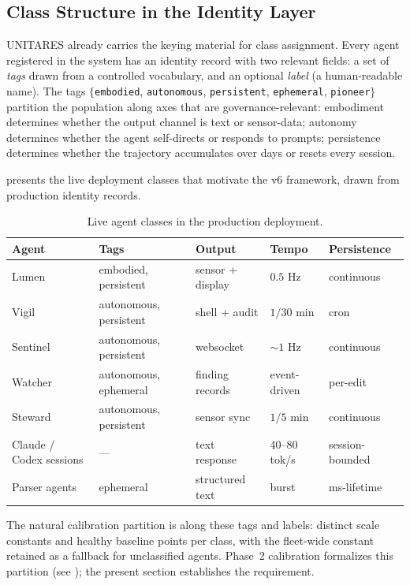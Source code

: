 \documentclass[11pt,twocolumn]{article}
\begin{document}
\subsection{Class Structure in the Identity Layer}
\label{sec:class-structure}

UNITARES already carries the keying material for class assignment.
Every agent registered in the system has an identity record with
two relevant fields: a set of \emph{tags} drawn from a controlled
vocabulary, and an optional \emph{label} (a human-readable name).
The tags
$\{$\texttt{embodied}, \texttt{autonomous}, \texttt{persistent},
\texttt{ephemeral}, \texttt{pioneer}$\}$
partition the population along axes that are governance-relevant:
embodiment determines whether the output channel is text or
sensor-data; autonomy determines whether the agent self-directs or
responds to prompts; persistence determines whether the
trajectory accumulates over days or resets every session.

 presents the live deployment classes that
motivate the v6 framework, drawn from production identity records.

\begin{table}[t]
\caption{Live agent classes in the production deployment.}
\label{tab:agent-classes}
\centering\small
\begin{tabular}{@{}lllll@{}}
\toprule
\textbf{Agent} & \textbf{Tags} & \textbf{Output} & \textbf{Tempo} & \textbf{Persistence} \\
\midrule
Lumen & embodied, persistent & sensor + display & $0.5$ Hz & continuous \\
Vigil & autonomous, persistent & shell + audit & $1/30$ min & cron \\
Sentinel & autonomous, persistent & websocket & $\sim 1$ Hz & continuous \\
Watcher & autonomous, ephemeral & finding records & event-driven & per-edit \\
Steward & autonomous, persistent & sensor sync & $1/5$ min & continuous \\
Claude / Codex sessions & --- & text response & $40$--$80$ tok/s & session-bounded \\
Parser agents & ephemeral & structured text & burst & ms-lifetime \\
\bottomrule
\end{tabular}
\end{table}

The natural calibration partition is along these tags and labels:
distinct scale constants and healthy baseline points per class,
with the fleet-wide constant retained as a fallback for
unclassified agents. Phase~2 calibration formalizes this partition
(see ); the present section establishes
the requirement.
\end{document}
